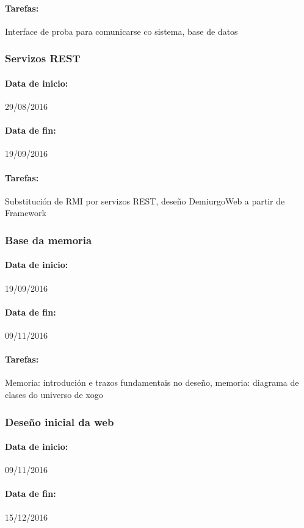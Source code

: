 \paragraph{Tarefas:} Interface de proba para comunicarse co sistema, base de
datos

\subsubsection{Servizos REST}
\paragraph{Data de inicio:} 29/08/2016
\paragraph{Data de fin:} 19/09/2016
\paragraph{Tarefas:} Substitución de RMI por servizos REST, deseño DemiurgoWeb a
partir de Framework

\subsubsection{Base da memoria}
\paragraph{Data de inicio:} 19/09/2016
\paragraph{Data de fin:} 09/11/2016
\paragraph{Tarefas:} Memoria: introdución e trazos fundamentais no deseño,
memoria: diagrama de clases do universo de xogo

\subsubsection{Deseño inicial da web}
\paragraph{Data de inicio:} 09/11/2016
\paragraph{Data de fin:} 15/12/2016
